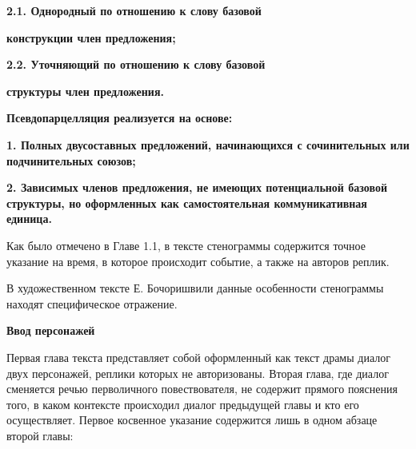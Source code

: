 \documentclass{kursa4}
\begin{document}
    {\bfseries\color[rgb]{0.2,0.2,0.2}
    \textmd{2.1. Однородный по отношению к слову базовой}}

    {\bfseries\color[rgb]{0.2,0.2,0.2}
    \textmd{конструкции член предложения;}}

    {\bfseries\color[rgb]{0.2,0.2,0.2}
    \textmd{2.2. Уточняющий по отношению к слову базовой}}

    {\bfseries\color[rgb]{0.2,0.2,0.2}
    \textmd{структуры член предложения.}}

    {\bfseries\color[rgb]{0.2,0.2,0.2}
    \textmd{}Псевдопарцелляция\textmd{ реализуется на основе:}}

    {\bfseries\color[rgb]{0.2,0.2,0.2}
    \textmd{1. }\textmd{Полных двусоставных п}\textmd{редложений,
    начинающихся с сочинительных или подчинительных союзов;}}

    {\bfseries\color[rgb]{0.2,0.2,0.2}
    \textmd{2. }\textmd{Зависимых членов предложения, }\textmd{не
    имеющих потенциальной базовой структуры, }\textmd{но оформленных как
    самостоятельная коммуникативная единица. }}


    \bigskip


    {\color[rgb]{0.2,0.2,0.2}
    \textcolor[rgb]{0.0,0.0,0.039215688}{Как было отмечено в Главе 1.1,
    в тексте стенограммы содержится точное указание на время, в которое
    происходит событие, а также на авторов реплик.}}

    {\color[rgb]{0.2,0.2,0.2}
    \textcolor[rgb]{0.0,0.0,0.039215688}{В художественном тексте Е.
    Бочоришвили данные особенности стенограммы находят специфическое
    отражение. }}

    {\centering\bfseries\color[rgb]{0.2,0.2,0.2}
    \textcolor[rgb]{0.0,0.0,0.039215688}{Ввод персонажей }
    \par}

    {\color[rgb]{0.2,0.2,0.2}
    \textcolor[rgb]{0.0,0.0,0.039215688}{}\textcolor[rgb]{0.0,0.0,0.039215688}{Первая
    глава текста}\textcolor[rgb]{0.0,0.0,0.039215688}{
    }\textcolor[rgb]{0.0,0.0,0.039215688}{представляет
    собой}\textcolor[rgb]{0.0,0.0,0.039215688}{
    }\textcolor[rgb]{0.0,0.0,0.039215688}{оформленный как текст драмы
    }\textcolor[rgb]{0.0,0.0,0.039215688}{диалог двух персонажей, реплики
    которых не авторизованы. }\textcolor[rgb]{0.0,0.0,0.039215688}{Вторая
    глава, }\textcolor[rgb]{0.0,0.0,0.039215688}{где диалог сменяется речью
    перволичного повествователя, не содержит прямого пояснения того, в
    каком контексте происходил диалог предыдущей главы и кто его
    осуществляет.}\textcolor[rgb]{0.0,0.0,0.039215688}{
    }\textcolor[rgb]{0.0,0.0,0.039215688}{Первое
    }\textcolor[rgb]{0.0,0.0,0.039215688}{косвенное}\textcolor[rgb]{0.0,0.0,0.039215688}{
    указание содержится }\textcolor[rgb]{0.0,0.0,0.039215688}{лишь
    }\textcolor[rgb]{0.0,0.0,0.039215688}{в одном абзаце второй
    гл}\textcolor[rgb]{0.0,0.0,0.039215688}{а}\textcolor[rgb]{0.0,0.0,0.039215688}{вы:}}
\end{document}
